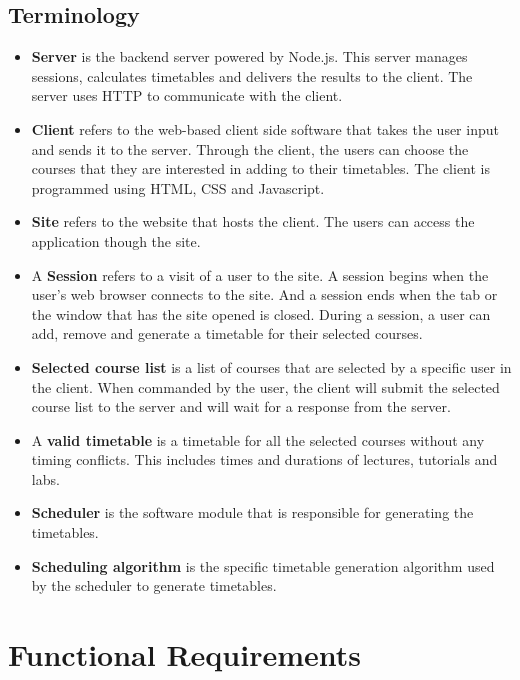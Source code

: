 \documentclass[12pt]{article}
\begin{document}
\subsection{Terminology}
\begin{itemize}
  \item \textbf{Server} is the backend server powered by Node.js. This server manages sessions, calculates timetables and delivers the results to the client. The server uses HTTP to communicate with the client.
  
  \item \textbf{Client} refers to the web-based client side software that takes the user input and sends it to the server. Through the client, the users can choose the courses that they are interested in adding to their timetables. The client is programmed using HTML, CSS and Javascript.
  
  \item \textbf{Site} refers to the website that hosts the client. The users can access the application though the site.
  
  \item A \textbf{Session} refers to a visit of a user to the site. A session begins when the user's web browser connects to the site. And a session ends when the tab or the window that has the site opened is closed. During a session, a user can add, remove and generate a timetable for their selected courses.
  
  \item \textbf{Selected course list} is a list of courses that are selected by a specific user in the client. When commanded by the user, the client will submit the selected course list to the server and will wait for a response from the server.
  
  \item A \textbf{valid timetable} is a timetable for all the selected courses without any timing conflicts. This includes times and durations of lectures, tutorials and labs.
  
  \item \textbf{Scheduler} is the software module that is responsible for generating the timetables.
  
  \item \textbf{Scheduling algorithm} is the specific timetable generation algorithm used by the scheduler to generate timetables.
\end{itemize}

\newpage
\section{Functional Requirements}
\end{document}
